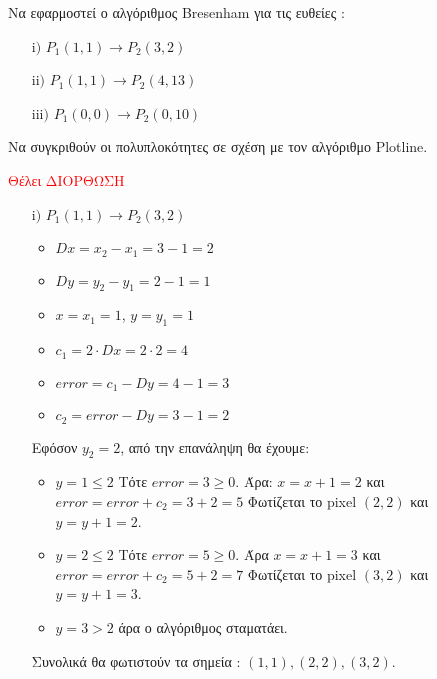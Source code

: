\begin{exercise}
		Να εφαρμοστεί ο αλγόριθμος Bresenham για τις ευθείες :
	\begin{enumerate}
		\item[$\mathrm{i)}$] $P_1(1, 1) \to P_2(3, 2)$
		\item[$\mathrm{ii)}$] $P_1(1, 1) \to P_2(4, 13)$
		\item[$\mathrm{iii)}$] $P_1(0, 0) \to P_2(0, 10)$	
	\end{enumerate}
	
	Να συγκριθούν οι πολυπλοκότητες σε σχέση με τον αλγόριθμο Plotline.	
\end{exercise}

\begin{solution}
	
\textcolor{red}{Θέλει ΔΙΟΡΘΩΣΗ}


\begin{enumerate}
    \item[$\mathrm{i)}$] $P_1(1, 1) \to P_2(3, 2)$
    
    \begin{itemize}
        \item $Dx = x_2 - x_1 = 3 - 1 = 2$
        \item $Dy = y_2 - y_1 = 2 - 1 = 1$
        \item $x = x_1  = 1$, $y = y_1 = 1$
        \item $c_1 = 2 \cdot Dx = 2 \cdot 2 = 4$
        \item $error = c_1 - Dy = 4 - 1 = 3$
        \item $c_2 = error - Dy = 3 - 1 = 2$
     \end{itemize}

Εφόσον $y_2 = 2$, από την επανάληψη θα έχουμε:
        
        \begin{itemize}
            \item \underline{$y = 1 \leq 2$} \newline 
            Τότε $error = 3 \geq 0$. Άρα: \newline 
            $x= x+1 = 2$ και $error = error + c_2 = 3 + 2 = 5$
            Φωτίζεται το pixel $(2,2)$ και $y = y+1 = 2$.
            \item \underline{$y = 2 \leq 2$} \newline 
             Τότε $error = 5 \geq 0$. Άρα  \newline 
            $x= x+1 = 3$ και $error = error + c_2 = 5 + 2 = 7$
            Φωτίζεται το pixel $(3,2)$ και $y = y+1 = 3$.
            \item \underline{$y = 3 > 2$} άρα ο αλγόριθμος σταματάει.
        \end{itemize}
Συνολικά θα φωτιστούν τα σημεία : $(1, 1), (2, 2), (3, 2)$.


\end{enumerate}
\end{solution}
